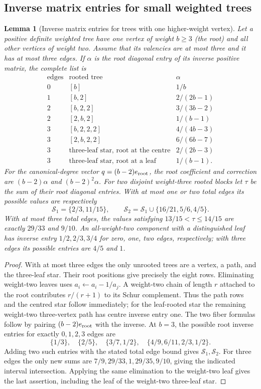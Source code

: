 \documentclass[11pt,reqno]{amsart}
\newtheorem{lemma}[lemma]{Lemma}
\theoremstyle{definition}
\theoremstyle{remark}
\numberwithin{equation}{section}
\begin{document}
\subsection{Inverse matrix entries for small weighted trees}
\begin{lemma}[Inverse matrix entries for trees with one higher-weight vertex]
\label{lem:rooted-trees}
Let a positive definite weighted tree have one vertex of weight $b\ge3$
(the root) and all other vertices of weight two. Assume that its valencies
are at most three and it has at most three edges. If $\alpha$ is the
root diagonal entry of its inverse positive matrix, the complete list is
\[
\begin{array}{c|l|c}
\text{edges}&\text{rooted tree}&\alpha\\\hline
0&[b]&1/b\\
1&[b,2]&2/(2b-1)\\
2&[b,2,2]&3/(3b-2)\\
2&[2,b,2]&1/(b-1)\\
3&[b,2,2,2]&4/(4b-3)\\
3&[2,b,2,2]&6/(6b-7)\\
3&\text{three-leaf star, root at the centre}&2/(2b-3)\\
3&\text{three-leaf star, root at a leaf}&1/(b-1).
\end{array}
\]
For the canonical-degree vector $q=(b-2)e_{\rm root}$, the root coefficient and correction
are $(b-2)\alpha$ and $(b-2)^2\alpha$.
For two disjoint weight-three rooted blocks let $\tau$ be the sum of
their root diagonal entries. With at most one or two total edges its
possible values are respectively
\[
 \mathcal S_1=\{2/3,11/15\},\qquad
 \mathcal S_2=\mathcal S_1\cup\{16/21,5/6,4/5\}.
\]
With at most three total edges, the values satisfying
$13/15<\tau\le14/15$ are exactly $29/33$ and $9/10$.
An all-weight-two component with a distinguished leaf has inverse entry
$1/2,2/3,3/4$ for zero, one, two edges, respectively; with three edges
its possible entries are $4/5$ and $1$.
\end{lemma}

\begin{proof}
With at most three edges the only unrooted trees are a vertex, a path,
and the three-leaf star. Their root positions give precisely the eight
rows. Eliminating weight-two leaves uses $a_i\leftarrow a_i-1/a_j$.
A weight-two chain of length $r$ attached to the root contributes
$r/(r+1)$ to its Schur complement. Thus the path rows and the centred
star follow immediately; for the leaf-rooted star the remaining
weight-two three-vertex path has centre inverse entry one.
The two fiber formulas follow by pairing $(b-2)e_{\rm root}$ with
the inverse. At $b=3$, the possible root inverse entries for exactly $0,1,2,3$ edges are
\[
 \{1/3\},\quad\{2/5\},\quad\{3/7,1/2\},\quad
 \{4/9,6/11,2/3,1/2\}.
\]
Adding two such entries with the stated total edge bound gives
$\mathcal S_1,\mathcal S_2$. For three edges the only new sums are
$7/9,29/33,1,29/35,9/10$, giving the indicated interval intersection.
Applying the same elimination to the weight-two leaf gives the last
assertion, including the leaf of the weight-two three-leaf star.
\end{proof}
\end{document}
